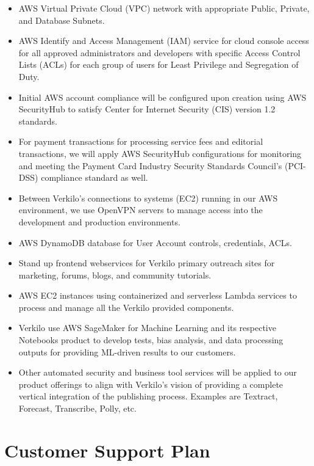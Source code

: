 \documentclass[11pt,openany]{book}
\providecommand{\tightlist}{%
  \setlength{\itemsep}{0pt}\setlength{\parskip}{0pt}}
\begin{document}
\begin{itemize}
\tightlist
\item
  AWS Virtual Private Cloud (VPC) network with appropriate Public,
  Private, and Database Subnets.
\item
  AWS Identify and Access Management (IAM) service for cloud console
  access for all approved administrators and developers with specific
  Access Control Lists (ACLs) for each group of users for Least
  Privilege and Segregation of Duty.
\item
  Initial AWS account compliance will be configured upon creation using
  AWS SecurityHub to satisfy Center for Internet Security (CIS) version
  1.2 standards.
\item
  For payment transactions for processing service fees and editorial
  transactions, we will apply AWS SecurityHub configurations for
  monitoring and meeting the Payment Card Industry Security Standards
  Council's (PCI-DSS) compliance standard as well.
\item
  Between Verkilo's connections to systems (EC2) running in our AWS
  environment, we use OpenVPN servers to manage access into the
  development and production environments.
\item
  AWS DynamoDB database for User Account controls, credentials, ACLs.
\item
  Stand up frontend webservices for Verkilo primary outreach sites for
  marketing, forums, blogs, and community tutorials.
\item
  AWS EC2 instances using containerized and serverless Lambda services
  to process and manage all the Verkilo provided components.
\item
  Verkilo use AWS SageMaker for Machine Learning and its respective
  Notebooks product to develop tests, bias analysis, and data processing
  outputs for providing ML-driven results to our customers.
\item
  Other automated security and business tool services will be applied to
  our product offerings to align with Verkilo's vision of providing a
  complete vertical integration of the publishing process. Examples are
  Textract, Forecast, Transcribe, Polly, etc.
\end{itemize}

\hypertarget{customer-support-plan}{%
\section{Customer Support Plan}\label{customer-support-plan}}
\end{document}
